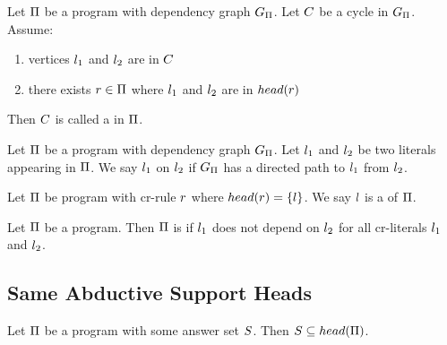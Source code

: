 \documentclass{paper}
\begin{document}
\begin{flushleft}
\begin{example}
\end{example}

\begin{definition}

Let $\Pi$ be a \cp{} program with dependency graph $G_{\Pi}$.
Let $C$ be a cycle in $G_{\Pi}$.
Assume:
\begin{enumerate}
\item
vertices ${l}_{1}$ and ${l}_{2}$ are in $C$
\item
there exists $r \in \Pi$ where
${l}_{1}$ and ${l}_{2}$ are in $head(r)$
\end{enumerate}
Then $C$ is called a \textdef{\hc} in $\Pi$.

\end{definition}

\begin{definition}

Let $\Pi$ be a \cp{} program with dependency graph $G_{\Pi}$.
Let ${l}_{1}$ and ${l}_{2}$ be two literals appearing in
$\Pi$.
We say ${l}_{1}$  on ${l}_{2}$ if
$G_{\Pi}$ has a directed path to ${l}_{1}$ from ${l}_{2}$.

\end{definition}

\begin{definition}
[CR-Literal]

Let $\Pi$ be \cp{} program with cr-rule $r$ where
$head(r) = \{l\}$.
We say $l$ is a  of $\Pi$.

\end{definition}

\begin{definition}
[CR-Independence]

Let $\Pi$ be a \cp{} program.
Then $\Pi$ is  if
${l}_{1}$ does not depend on ${l}_{2}$
for all cr-literals ${l}_{1}$ and ${l}_{2}$.

\end{definition}

\subsection{Same Abductive Support Heads}

\begin{remark}

Let $\Pi$ be a \cp{} program with some answer set $S$.
Then $S \subseteq head(\Pi)$.

\end{remark}


\end{flushleft}
\end{document}
